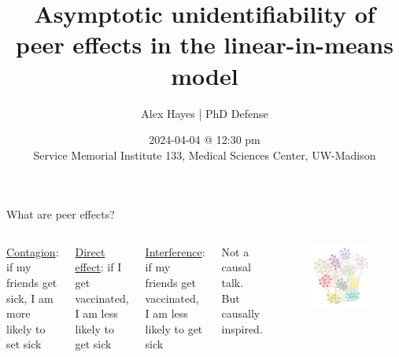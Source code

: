 \documentclass[aspectratio=169]{beamer}
\title{Asymptotic unidentifiability of peer effects in the linear-in-means model}
\date{2024-04-04 @ 12:30 pm\\ Service Memorial Institute 133, Medical Sciences Center, UW-Madison}
\author{Alex Hayes | PhD Defense}
\institute{Department of Statistics, University of Wisconsin-Madison}
\theoremstyle{remark}
\begin{document}
\maketitle


\begin{frame}{What are peer effects?}
    \begin{columns}
        \vspace{7mm}
        
        \underline{Contagion}: if my friends get sick, I am more likely to set sick
        
        \vspace{4mm}
        
        \underline{Direct effect}: if I get vaccinated, I am less likely to get sick
        
        \vspace{4mm}
        
        \underline{Interference}: if my friends get vaccinated, I am less likely to get sick
        
        \vspace{7mm}
        
        {\footnotesize * Not a causal talk. But causally inspired.}
        
        \begin{figure}[ht]
            \centering
            \includegraphics[width=\textwidth]{figures/assortative.png}
        \end{figure}
    \end{columns}
\end{frame}
\end{document}
